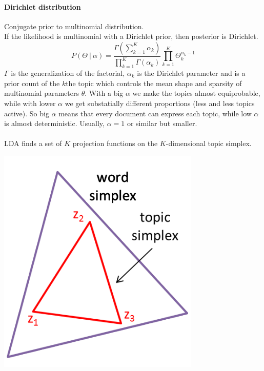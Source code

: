 \documentclass[10pt]{report}
\begin{document}
\paragraph{Dirichlet distribution} Conjugate prior to multinomial distribution.\\
If the likelihood is multinomial with a Dirichlet prior, then posterior is Dirichlet.
$$P(\Theta\:|\:\alpha) = \frac{\Gamma(\sum_{k=1}^K \alpha_k)}{\prod_{k=1}^K\Gamma(\alpha_k)}\prod_{k=1}^K\Theta_k^{\alpha_k-1}$$
$\Gamma$ is the generalization of the factorial, $\alpha_k$ is the Dirichlet parameter and is a prior count of the $k$the topic which controls the mean shape and sparsity of multinomial parameters $\theta$. With a big $\alpha$ we make the topics almost equiprobable, while with lower $\alpha$ we get substatially different proportions (less and less topics active). So big $\alpha$ means that every document can express each topic, while low $\alpha$ is almost deterministic. Usually, $\alpha = 1$ or similar but smaller.\\\\
LDA finds a set of $K$ projection functions on the $K$-dimensional topic simplex.\begin{center}
	\includegraphics[scale=0.5]{41.png}
\end{center}
\end{document}
